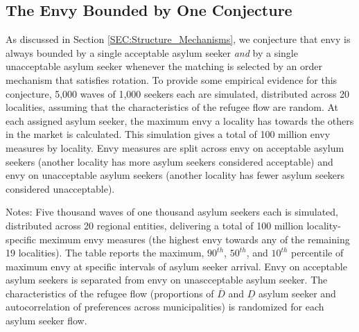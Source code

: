\documentclass[12pt,fleqn]{article}
\begin{document}
\subsection{The Envy Bounded by One Conjecture}
As discussed in Section \ref{SEC:Structure_Mechanisms}, we conjecture that envy is always bounded by a single acceptable asylum seeker \emph{and} by a single unacceptable asylum seeker whenever the matching is selected by an order mechanism that satisfies rotation. To provide some empirical evidence for this conjecture, 5,000 waves of 1,000 seekers each are simulated, distributed across 20 localities, assuming that the characteristics of the refugee flow are random. At each assigned asylum seeker, the maximum envy a locality has towards the others in the market is calculated. This simulation gives a total of 100 million envy measures by locality. Envy measures are split across envy on acceptable asylum seekers (another locality has more asylum seekers considered acceptable) and envy on unacceptable asylum seekers (another locality has fewer asylum seekers considered unacceptable).

\begin{table}[h]
\caption{Simulation results for the conjecture that envy is bounded by one in acceptable and unacceptable asylum seekers.}
\label{TABLE:conjecture_1}
{\scriptsize \vspace{0.1em}
	\begin{singlespace}
		{\sc Notes:} Five thousand waves of one thousand asylum seekers each is simulated, distributed across 20 regional entities, delivering a total of 100 million locality-specific meximum envy measures (the highest envy towards any of the remaining 19 localities). The table reports the maximum, $90^{th}$, $50^{th}$, and $10^{th}$ percentile of maximum envy at specific intervals of asylum seeker arrival. Envy on acceptable asylum seekers is separated from envy on unascceptable asylum seeker. The characteristics of the refugee flow (proportions of $\overline{D}$ and $\underline{D}$ asylum seeker and autocorrelation of preferences across municipalities) is randomized for each asylum seeker flow.
	\end{singlespace}
	 }
	\end{table}
\end{document}
